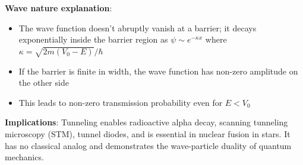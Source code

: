 \documentclass[11pt]{article}
\begin{document}
\begin{enumerate}[label=\textbf{\arabic*.}]
  \textbf{Wave nature explanation}:
  \begin{itemize}
    \item The wave function doesn't abruptly vanish at a barrier; it decays exponentially inside the 
    barrier region as $\psi \sim e^{-\kappa x}$ where $\kappa = \sqrt{2m(V_0-E)}/\hbar$
    \item If the barrier is finite in width, the wave function has non-zero amplitude on the other side
    \item This leads to non-zero transmission probability even for $E < V_0$
  \end{itemize}

  \textbf{Implications}: Tunneling enables radioactive alpha decay, scanning tunneling microscopy (STM), 
  tunnel diodes, and is essential in nuclear fusion in stars. It has no classical analog and demonstrates 
  the wave-particle duality of quantum mechanics.

\end{enumerate}
\end{document}
